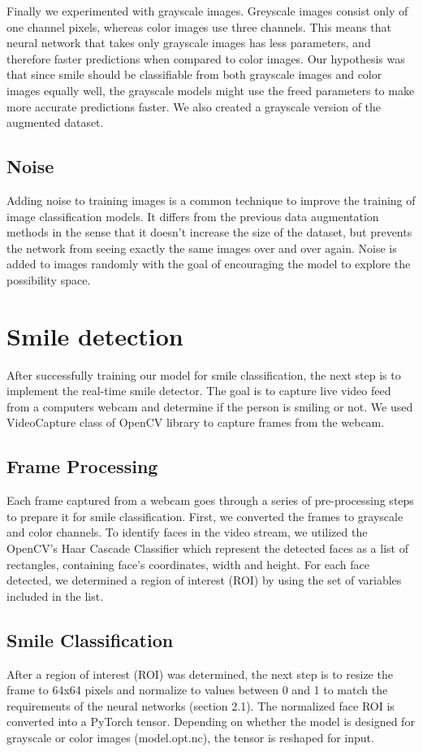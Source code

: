 \documentclass[12pt,a4paper,english
]{tunithesis}
\begin{document}
Finally we experimented with grayscale images. Greyscale images consist only of one channel pixels, whereas color images use three channels. This means that neural network that takes only grayscale images has less parameters, and therefore faster predictions when compared to color images. Our hypothesis was that since smile should be classifiable from both grayscale images and color images equally well, the grayscale models might use the freed parameters to make more accurate predictions faster. We also created a grayscale version of the augmented dataset.

\subsection{Noise}
\label{sec:noise}
Adding noise to training images is a common technique to improve the training of image classification models. It differs from the previous data augmentation methods in the sense that it doesn't increase the size of the dataset, but prevents the network from seeing exactly the same images over and over again. Noise is added to images randomly with the goal of encouraging the model to explore the possibility space.\cite{dlbook}

\section{Smile detection}
After successfully training our model for smile classification, the next step is to implement the real-time smile detector. The goal is to capture live video feed from a computers webcam and determine if the person is smiling or not. We used VideoCapture class of OpenCV library to capture frames from the webcam. 

\subsection{Frame Processing}
Each frame captured from a webcam goes through a series of pre-processing steps to prepare it for smile classification. First, we converted the frames to grayscale and color channels. To identify faces in the video stream, we utilized the OpenCV's Haar Cascade Classifier which represent the detected faces as a list of rectangles, containing face's coordinates, width and height. For each face detected, we determined a region of interest (ROI) by using the set of variables included in the list.

\subsection{Smile Classification}
After a region of interest (ROI) was determined, the next step is to resize the frame to 64x64 pixels and normalize to values between 0 and 1 to match the requirements of the neural networks (section 2.1). The normalized face ROI is converted into a PyTorch tensor. Depending on whether the model is designed for grayscale or color images (model.opt.nc), the tensor is reshaped for input.
\end{document}
